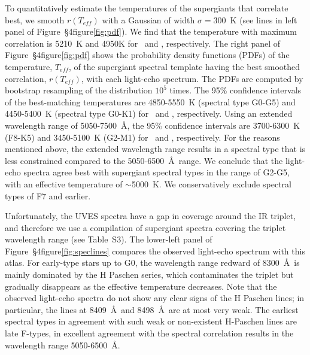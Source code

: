 To quantitatively estimate the temperatures of the supergiants that
correlate best, we smooth $r(T_{eff})$ with a Gaussian of width
$\sigma=300$~K (see lines in left panel of Figure~\S4figure\ref{fig:pdf}). We
find that the temperature with maximum correlation is 5210~K and 4950K
for \specMlo\ and \specDP, respectively. The right panel of
Figure~\S4figure\ref{fig:pdf} shows the probability density functions (PDFs)
of the temperature, $T_{eff}$, of the supergiant spectral template
having the best smoothed correlation, $r(T_{eff})$, with each
light-echo spectrum. The PDFs are computed by bootstrap resampling of
the distribution $10^5$ times.  The 95\% confidence intervals of the
best-matching temperatures are 4850-5550~K (spectral type G0-G5) and
4450-5400~K (spectral type G0-K1) for \specMlo\ and \specDP,
respectively.  Using an extended wavelength range of 5050-7500~\AA,
the 95\% confidence intervals are 3700-6300~K (F8-K5) and 3450-5100~K
(G2-M1) for \specMlo\ and \specDP, respectively. For the reasons
mentioned above, the extended wavelength range results in a spectral
type that is less constrained compared to the 5050-6500~\AA\ range.
We conclude that the light-echo spectra agree best with supergiant
spectral types in the range of G2-G5,
\ifcheck
\fi
with an effective temperature of $\sim$5000~K.
\ifcheck
\fi
We conservatively exclude spectral types of F7 and earlier.



Unfortunately, the UVES spectra have a gap in coverage around the
 IR triplet, and therefore we use a compilation of
supergiant spectra\cite{Cenarro01} covering the  triplet
wavelength range (see Table~S3).
\ifcheck
\fi
The lower-left panel of Figure~\S4figure\ref{fig:speclines} compares the
observed light-echo spectrum with this atlas. For early-type stars up
to G0, the wavelength range redward of 8300~\AA\ is mainly dominated
by the H Paschen series, which contaminates the  triplet
but gradually disappears as the effective temperature
decreases\cite{Cenarro01}. Note that the observed light-echo spectra
do not show any clear signs of the H Paschen lines; in particular, the
lines at 8409~\AA\ and 8498~\AA\ are at most very weak.  The earliest
spectral types in agreement with such weak or non-existent H-Paschen
lines are late F-types, in excellent agreement with the spectral
correlation results in the wavelength range 5050-6500~\AA.

